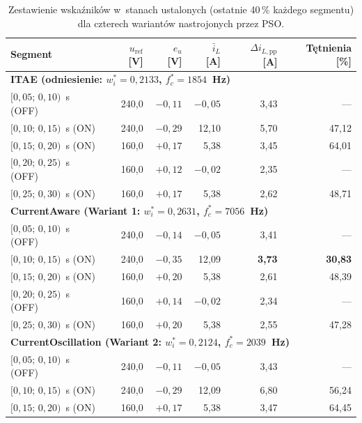 \begin{table}[h!]
    \centering
    \small
    \caption{Zestawienie wskaźników w~stanach ustalonych (ostatnie 40\,\% każdego segmentu) dla czterech wariantów nastrojonych przez PSO.}
    \label{tab:scenariusz-metryki}
    \begin{tabular}{lrrrrr}
        \toprule
        \textbf{Segment} & $u_{\mathrm{ref}}$~[V] & $e_u$~[V] & $\bar{i}_L$~[A] & $\Delta i_{L,\mathrm{pp}}$~[A] & Tętnienia [\%] \\
        \midrule
        \multicolumn{6}{l}{\textbf{ITAE (odniesienie: $w_i^* = 0{,}2133$, $f_c^* = 1854$~Hz)}} \\
        $[0{,}05;\, 0{,}10)$~s (OFF) & 240{,}0 & $-0{,}11$ & $-0{,}05$ & 3{,}43 & --- \\
        $[0{,}10;\, 0{,}15)$~s (ON)  & 240{,}0 & $-0{,}29$ & 12{,}10 & 5{,}70 & 47{,}12 \\
        $[0{,}15;\, 0{,}20)$~s (ON)  & 160{,}0 & $+0{,}17$ & 5{,}38 & 3{,}45 & 64{,}01 \\
        $[0{,}20;\, 0{,}25)$~s (OFF) & 160{,}0 & $+0{,}12$ & $-0{,}02$ & 2{,}35 & --- \\
        $[0{,}25;\, 0{,}30)$~s (ON)  & 160{,}0 & $+0{,}17$ & 5{,}38 & 2{,}62 & 48{,}71 \\
        \midrule
        \multicolumn{6}{l}{\textbf{CurrentAware (Wariant 1: $w_i^* = 0{,}2631$, $f_c^* = 7056$~Hz)}} \\
        $[0{,}05;\, 0{,}10)$~s (OFF) & 240{,}0 & $-0{,}14$ & $-0{,}05$ & 3{,}41 & --- \\
        $[0{,}10;\, 0{,}15)$~s (ON)  & 240{,}0 & $-0{,}35$ & 12{,}09 & \textbf{3{,}73} & \textbf{30{,}83} \\
        $[0{,}15;\, 0{,}20)$~s (ON)  & 160{,}0 & $+0{,}20$ & 5{,}38 & 2{,}61 & 48{,}39 \\
        $[0{,}20;\, 0{,}25)$~s (OFF) & 160{,}0 & $+0{,}14$ & $-0{,}02$ & 2{,}34 & --- \\
        $[0{,}25;\, 0{,}30)$~s (ON)  & 160{,}0 & $+0{,}20$ & 5{,}38 & 2{,}55 & 47{,}28 \\
        \midrule
        \multicolumn{6}{l}{\textbf{CurrentOscillation (Wariant 2: $w_i^* = 0{,}2124$, $f_c^* = 2039$~Hz)}} \\
        $[0{,}05;\, 0{,}10)$~s (OFF) & 240{,}0 & $-0{,}11$ & $-0{,}05$ & 3{,}43 & --- \\
        $[0{,}10;\, 0{,}15)$~s (ON)  & 240{,}0 & $-0{,}29$ & 12{,}09 & 6{,}80 & 56{,}24 \\
        $[0{,}15;\, 0{,}20)$~s (ON)  & 160{,}0 & $+0{,}17$ & 5{,}38 & 3{,}47 & 64{,}45 \\

\end{tabular}
\end{table}
